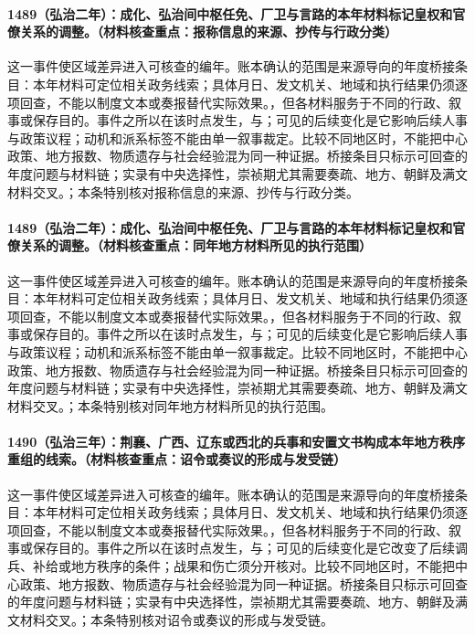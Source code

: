 \paragraph{1489（弘治二年）：成化、弘治间中枢任免、厂卫与言路的本年材料标记皇权和官僚关系的调整。（材料核查重点：报称信息的来源、抄传与行政分类）} 这一事件使区域差异进入可核查的编年。账本确认的范围是来源导向的年度桥接条目：本年材料可定位相关政务线索；具体月日、发文机关、地域和执行结果仍须逐项回查，不能以制度文本或奏报替代实际效果。，但各材料服务于不同的行政、叙事或保存目的。事件之所以在该时点发生，与；可见的后续变化是它影响后续人事与政策议程；动机和派系标签不能由单一叙事裁定。比较不同地区时，不能把中心政策、地方报数、物质遗存与社会经验混为同一种证据。桥接条目只标示可回查的年度问题与材料链；实录有中央选择性，崇祯期尤其需要奏疏、地方、朝鲜及满文材料交叉。；本条特别核对报称信息的来源、抄传与行政分类。

\paragraph{1489（弘治二年）：成化、弘治间中枢任免、厂卫与言路的本年材料标记皇权和官僚关系的调整。（材料核查重点：同年地方材料所见的执行范围）} 这一事件使区域差异进入可核查的编年。账本确认的范围是来源导向的年度桥接条目：本年材料可定位相关政务线索；具体月日、发文机关、地域和执行结果仍须逐项回查，不能以制度文本或奏报替代实际效果。，但各材料服务于不同的行政、叙事或保存目的。事件之所以在该时点发生，与；可见的后续变化是它影响后续人事与政策议程；动机和派系标签不能由单一叙事裁定。比较不同地区时，不能把中心政策、地方报数、物质遗存与社会经验混为同一种证据。桥接条目只标示可回查的年度问题与材料链；实录有中央选择性，崇祯期尤其需要奏疏、地方、朝鲜及满文材料交叉。；本条特别核对同年地方材料所见的执行范围。

\paragraph{1490（弘治三年）：荆襄、广西、辽东或西北的兵事和安置文书构成本年地方秩序重组的线索。（材料核查重点：诏令或奏议的形成与发受链）} 这一事件使区域差异进入可核查的编年。账本确认的范围是来源导向的年度桥接条目：本年材料可定位相关政务线索；具体月日、发文机关、地域和执行结果仍须逐项回查，不能以制度文本或奏报替代实际效果。，但各材料服务于不同的行政、叙事或保存目的。事件之所以在该时点发生，与；可见的后续变化是它改变了后续调兵、补给或地方秩序的条件；战果和伤亡须分开核对。比较不同地区时，不能把中心政策、地方报数、物质遗存与社会经验混为同一种证据。桥接条目只标示可回查的年度问题与材料链；实录有中央选择性，崇祯期尤其需要奏疏、地方、朝鲜及满文材料交叉。；本条特别核对诏令或奏议的形成与发受链。

